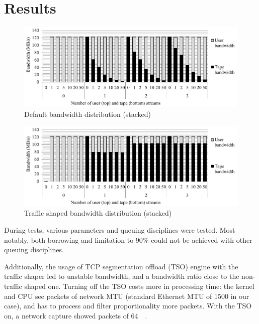 \documentclass[a4paper]{jpconf}
\begin{document}
\section{Results}

\begin{figure}[h]
\begin{center}
\includegraphics{Bandwidth_without_traffic_shaping}
\end{center}
\caption{\label{nots_bandwidth_plot}Default bandwidth distribution (stacked)}
\end{figure}

\begin{figure}[h]
\begin{center}
\includegraphics{Bandwidth_with_traffic_shaping}
\end{center}
\caption{\label{ts_bandwidth_plot}Traffic shaped bandwidth distribution (stacked)}
\end{figure}

During tests, various parameters and queuing disciplines were tested. Most notably, both borrowing and limitation to 90\% could not be achieved with other queuing disciplines. 

Additionally, the usage of TCP segmentation offload (TSO) engine with the traffic shaper led to unstable bandwidth, and a bandwidth ratio close to the non-traffic shaped one. Turning off the TSO costs more in processing time: the kernel and CPU see packets of network MTU (standard Ethernet MTU of \SI{1500}{\byte} in our case), and has to process and filter proportionality more packets. With the TSO on, a network capture showed packets of \SI{64}{\kilo\byte}.
\end{document}
